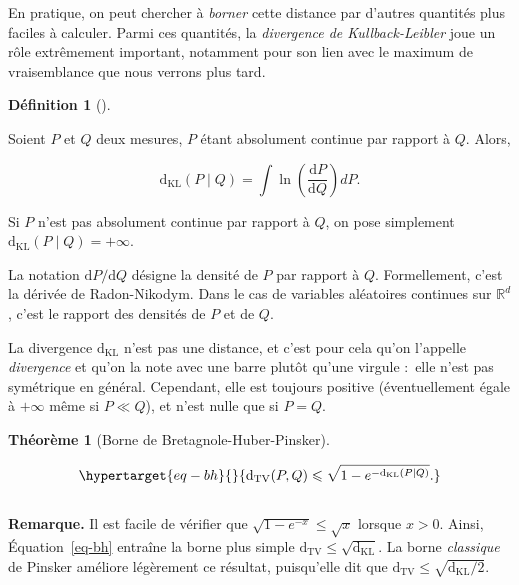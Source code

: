 \documentclass[
  10,
  letterpaper,
  DIV=11,
  numbers=noendperiod]{scrreport}
\newcommand{\dkl}{\mathrm{d}_{\mathrm{KL}}}
\newcommand{\dtv}{\mathrm{d}_{\mathrm{TV}}}
\theoremstyle{plain}
\newtheorem{theorem}{Théorème}[chapter]
\theoremstyle{definition}
\theoremstyle{plain}
\theoremstyle{definition}
\newtheorem{definition}{Définition}[chapter]
\theoremstyle{definition}
\theoremstyle{plain}
\theoremstyle{remark}
\begin{document}
En pratique, on peut chercher à \emph{borner} cette distance par
d'autres quantités plus faciles à calculer. Parmi ces quantités, la
\emph{divergence de Kullback-Leibler} joue un rôle extrêmement
important, notamment pour son lien avec le maximum de vraisemblance que
nous verrons plus tard.

\begin{definition}[]\protect\hypertarget{def-dkl}{}\label{def-dkl}

Soient \(P\) et \(Q\) deux mesures, \(P\) étant absolument continue par
rapport à \(Q\). Alors,

\[ \dkl(P \mid Q) = \int \ln \left(\frac{\mathrm{d}P}{\mathrm{d}Q}\right)dP. \]

Si \(P\) n'est pas absolument continue par rapport à \(Q\), on pose
simplement \(\dkl(P \mid Q) = +\infty\).

\end{definition}

La notation \(\mathrm{d}P/\mathrm{d}Q\) désigne la densité de \(P\) par
rapport à \(Q\). Formellement, c'est la dérivée de Radon-Nikodym. Dans
le cas de variables aléatoires continues sur \(\mathbb{R}^d\), c'est le
rapport des densités de \(P\) et de \(Q\).

La divergence \(\dkl\) n'est pas une distance, et c'est pour cela qu'on
l'appelle \emph{divergence} et qu'on la note avec une barre plutôt
qu'une virgule :~elle n'est pas symétrique en général. Cependant, elle
est toujours positive (éventuellement égale à \(+\infty\) même si
\(P\ll Q\)), et n'est nulle que si \(P=Q\).

\begin{theorem}[Borne de
Bretagnole-Huber-Pinsker]\protect\hypertarget{thm-BH}{}\label{thm-BH}

\begin{equation}\protect\hypertarget{eq-bh}{}{ \dtv(P,Q) \leqslant \sqrt{1 - e^{-\dkl(P \mid Q)}}.}\label{eq-bh}\end{equation}

\end{theorem}

\[~~\]

\textbf{Remarque.} Il est facile de vérifier que
\(\sqrt{1-e^{-x}}\leqslant \sqrt{x}\) lorsque \(x>0\). Ainsi,
Équation~\ref{eq-bh} entraîne la borne plus simple
\(\dtv \leqslant \sqrt{\dkl}\). La borne \emph{classique} de Pinsker
améliore légèrement ce résultat, puisqu'elle dit que
\(\dtv \leqslant \sqrt{\dkl/2}\).
\end{document}
